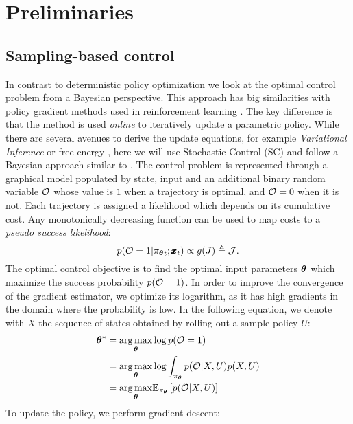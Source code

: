 \section{Preliminaries} \label{sec:theory}

\subsection{Sampling-based control}
In contrast to deterministic policy optimization we look at the optimal control problem from a Bayesian perspective. This approach has big similarities with policy gradient methods used in reinforcement learning \cite{williams1992simple}. The key difference is that the method is used \emph{online} to iteratively update a parametric policy. While there are several avenues to derive the update equations, for example \emph{Variational Inference} \cite{lambert_stein_2020} or free energy \cite{williams_information_2017}, here we will use Stochastic Control (SC) and follow a Bayesian approach similar to \cite{levine2018reinforcement}. The control problem is represented through a graphical model populated by state, input and an additional binary random variable $\mathcal{O}$ whose value is $1$ when a trajectory is optimal, and $\mathcal{O} = 0$ when it is not. Each trajectory is assigned a likelihood which depends on its cumulative cost. Any monotonically decreasing function can be used to map costs to a \textit{pseudo success likelihood}:
\begin{equation}
p(\mathcal{O} = 1| {\pi_{\boldsymbol{\theta}}}_{t}; \pmb{x}_t ) \propto g(J) \triangleq \mathcal{J}.
\end{equation}
The optimal control objective is to find the optimal input parameters $\boldsymbol{\theta}$ which maximize the success probability $p(\mathcal{O} = 1)$. In order to improve the convergence of the gradient estimator, we optimize its logarithm, as it has high gradients in the domain where the probability is low. In the following equation, we denote with $X$ the sequence of states obtained by rolling out a sample policy $U$: 
\begin{align}
    \boldsymbol{\theta}^* &= \underset{\boldsymbol{\theta}}{\arg\max} \log p(\mathcal{O} = 1) \\
        &= \underset{\boldsymbol{\theta}}{\arg\max} \log \int_{\pi_{\boldsymbol{\theta}}} p(\mathcal{O} | X, U) p(X, U) \\
        &= \underset{\boldsymbol{\theta}}{\arg\max}  \mathbb{E}_{\pi_{\boldsymbol{\theta}}} \left [p(\mathcal{O} | X, U)\right] \label{eq:input_to_params}
\end{align}
To update the policy, we perform gradient descent:
